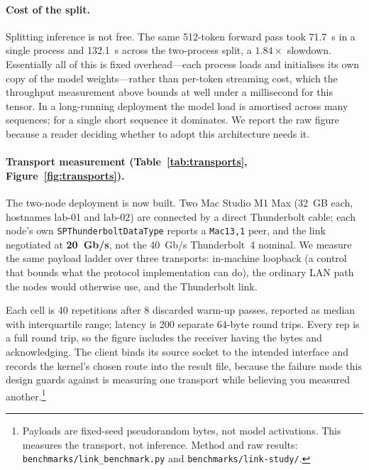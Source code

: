 \documentclass[11pt]{article}
\begin{document}
\paragraph{Cost of the split.} Splitting inference is not free. The same 512-token forward pass took 71.7~s in a single process and 132.1~s across the two-process split, a $1.84\times$ slowdown. Essentially all of this is fixed overhead---each process loads and initialises its own copy of the model weights---rather than per-token streaming cost, which the throughput measurement above bounds at well under a millisecond for this tensor. In a long-running deployment the model load is amortised across many sequences; for a single short sequence it dominates. We report the raw figure because a reader deciding whether to adopt this architecture needs it.

\paragraph{Transport measurement (Table~\ref{tab:transports}, Figure~\ref{fig:transports}).}
The two-node deployment is now built. Two Mac Studio M1 Max (32~GB each, hostnames
lab-01 and lab-02) are connected by a direct Thunderbolt cable; each node's own
\texttt{SPThunderboltDataType} reports a \texttt{Mac13,1} peer, and the link negotiated
at \textbf{20~Gb/s}, not the 40~Gb/s Thunderbolt~4 nominal. We measure the same payload
ladder over three transports: in-machine loopback (a control that bounds what the
protocol implementation can do), the ordinary LAN path the nodes would otherwise use,
and the Thunderbolt link.

Each cell is 40 repetitions after 8 discarded warm-up passes, reported as median with
interquartile range; latency is 200 separate 64-byte round trips. Every rep is a full
round trip, so the figure includes the receiver having the bytes and acknowledging.
The client binds its source socket to the intended interface and records the kernel's
chosen route into the result file, because the failure mode this design guards against
is measuring one transport while believing you measured another.\footnote{Payloads are
fixed-seed pseudorandom bytes, not model activations. This measures the transport, not
inference. Method and raw results: \texttt{benchmarks/link\_benchmark.py} and
\texttt{benchmarks/link-study/}.}
\end{document}
